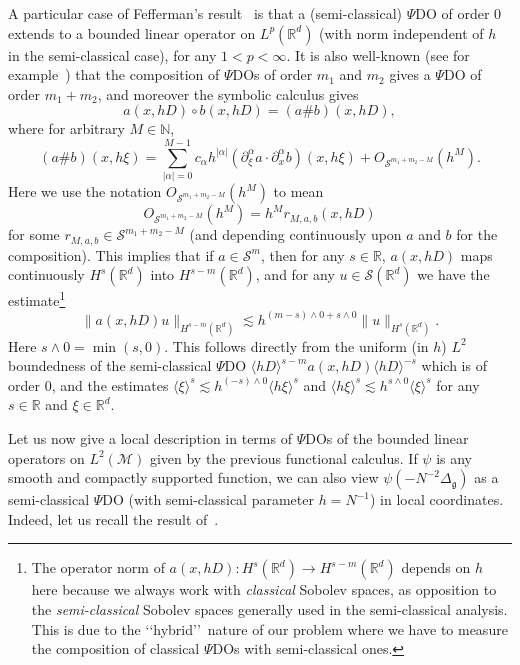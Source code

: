 \documentclass[10pt]{amsart}
\theoremstyle{definition}\newtheorem{defi}[theo]{Definition}\newtheorem{rema}[theo]{Remark}\newtheorem{exam}[theo]{Example}\newtheorem{exem}[theo]{Example}\newtheorem{nota}[theo]{Notation}
\newcommand{\R}{\mathbb{R}}
\newcommand{\N}{\mathbb{N}}
\renewcommand{\S}{\mathcal{S}}
\newcommand{\M}{\mathcal{M}}
\newcommand{\g}{\mathfrak{g}}
\newcommand{\Dlg}{\Delta_{\g}}
\newcommand{\les}{\lesssim}
\newcommand{\jb}[1] {\langle #1 \rangle}
\begin{document}
A particular case of Fefferman's result~\cite{F} is that a (semi-classical) $\Psi$DO of order 0 extends to a bounded linear operator on $L^p(\R^d)$ (with norm independent of $h$ in the semi-classical case), for any $1<p<\infty$. It is also well-known (see for example~\cite{Zworski}) that the composition of $\Psi$DOs of order $m_1$ and $m_2$ gives a $\Psi$DO of order $m_1+m_2$, and moreover the symbolic calculus gives
\begin{equation*}
a(x,hD)\circ b(x,hD) = (a\#b)(x,hD),
\end{equation*}
where for arbitrary $M\in\N$,
\begin{equation}\label{def-pscomp}
(a\#b)(x,h\xi)=\sum_{|\alpha|=0}^{M-1}c_\alpha h^{|\alpha|}\left(\partial_{\xi}^{\alpha}a\cdot\partial_{x}^{\alpha}b\right)(x,h\xi) + O_{\S^{m_1+m_2-M}}\left(h^M\right).
\end{equation}
Here we use the notation $O_{\S^{m_1+m_2-M}}(h^M)$ to mean
\begin{equation*}
O_{\S^{m_1+m_2-M}}(h^M)= h^Mr_{M,a,b}(x,hD)
\end{equation*}
for some $r_{M,a,b}\in \S^{m_1+m_2-M}$ (and depending continuously upon $a$ and $b$ for the composition). This implies that if $a\in\S^m$, then for any $s\in\R$, $a(x,hD)$ maps continuously $H^{s}(\R^d)$ into $H^{s-m}(\R^d)$, and for any $u\in\S(\R^d)$ we have the estimate\footnote{The operator norm of $a(x,hD): H^s(\R^d)\rightarrow H^{s-m}(\R^d)$ depends on $h$ here because we always work with \emph{classical} Sobolev spaces, as opposition to the \emph{semi-classical} Sobolev spaces generally used in the semi-classical analysis. This is due to the \lq\lq hybrid\rq\rq~nature of our problem where we have to measure the composition of classical $\Psi$DOs with semi-classical ones.}
\begin{equation}\label{estim-SCPDO}
\|a(x,hD)u\|_{H^{s-m}(\R^d)}\les h^{(m-s)\wedge 0+s\wedge 0}\|u\|_{H^s(\R^d)}.
\end{equation}
Here $s\wedge 0 = \min (s,0)$. This follows directly from the uniform (in $h$) $L^2$ boundedness of the semi-classical $\Psi$DO $\jb{hD}^{s-m}a(x,hD)\jb{hD}^{-s}$ which is of order 0, and the estimates $\jb{\xi}^s\les h^{(-s)\wedge 0}\jb{h\xi}^s$ and $\jb{h\xi}^s\les h^{s\wedge 0}\jb{\xi}^s$ for any $s\in\R$ and $\xi\in\R^d$.

Let us now give a local description in terms of $\Psi$DOs of the bounded linear operators on $L^2(\M)$ given by the previous functional calculus. If $\psi$ is any smooth and compactly supported function, we can also view $\psi(-N^{-2}\Dlg)$ as a semi-classical $\Psi$DO (with semi-classical parameter $h=N^{-1}$) in local coordinates. Indeed, let us recall the result of~\cite[Proposition~2.1]{BGT}.
\end{document}
